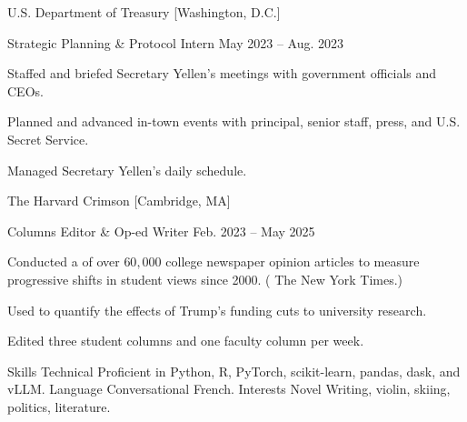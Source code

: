 \documentclass[11pt,a4paper]{article}
\begin{document}
\Entry
    {U.S. Department of Treasury}
    [Washington, D.C.]
    {
        \Position
            {Strategic Planning \& Protocol Intern}
            {May 2023 -- Aug. 2023}
            {
                \item Staffed and briefed Secretary Yellen's meetings with government officials and CEOs.
                \item Planned and advanced in-town events with principal, senior staff, press, and U.S. Secret Service.
                \item Managed Secretary Yellen's daily schedule.
            }
    }
\Entry
    {The Harvard Crimson}
    [Cambridge, MA]
    {
        \Position
            {Columns Editor \& Op-ed Writer}
            {Feb. 2023 -- May 2025}
            {
                \item Conducted a  of over $60,000$ college newspaper opinion articles to measure progressive shifts in student views since 2000. ( The New York Times.)
                \item Used  to quantify the effects of Trump's funding cuts to university research.
                \item Edited three student columns and one faculty column per week.
            }
    }
\SectionHeader
    {Skills}
\SkillEntry
    {Technical}
    {Proficient in Python, R, PyTorch, scikit-learn, pandas, dask, and vLLM.}
\SkillEntry
    {Language}
    {Conversational French.}
\SkillEntry
    {Interests}
    {Novel Writing, violin, skiing, politics, literature.}
\end{document}
